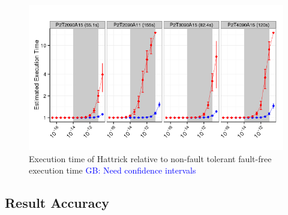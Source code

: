 \documentclass{sig-alternate}
\newcommand{\sui}[1]{%
  \textcolor{green}{SC - #1}
}
\newcommand{\greg}[1]{%
  \textcolor{blue}{GB: #1}
}
\begin{document}
{\begin{figure}[ht!]
\centering
\includegraphics[width=2.00\columnwidth]{figs/Hattrick_EstdCost.png}
\vspace{-10pt}
\caption{Execution time of Hattrick relative to non-fault tolerant fault-free execution time \greg{Need confidence intervals}}
\vspace{-10pt}
\label{fig:Hattrick_EstdCost}
\end{figure}





\subsection{Result Accuracy}
\label{sec:eval:acc}


}
\end{document}
